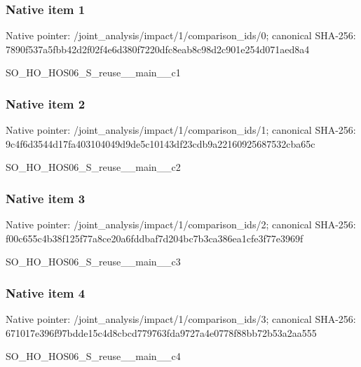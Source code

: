 \documentclass[10pt,a4paper]{article}
\begin{document}
\subsubsection{Native item 1}
Native pointer: /joint\_\allowbreak{}analysis/impact/1/comparison\_\allowbreak{}ids/0; canonical SHA-256: 7890f537a5fbb42d2f02f4e6d380f7220dfc8eab8c98d2c901e254d071aed8a4

\begingroup\raggedright\sloppy SO\_\allowbreak{}HO\_\allowbreak{}HOS06\_\allowbreak{}S\_\allowbreak{}reuse\_\allowbreak{}\_\allowbreak{}main\_\allowbreak{}\_\allowbreak{}c1\par\endgroup

\subsubsection{Native item 2}
Native pointer: /joint\_\allowbreak{}analysis/impact/1/comparison\_\allowbreak{}ids/1; canonical SHA-256: 9c4f6d3544d17fa403104049d9de5c10143df23cdb9a22160925687532cba65c

\begingroup\raggedright\sloppy SO\_\allowbreak{}HO\_\allowbreak{}HOS06\_\allowbreak{}S\_\allowbreak{}reuse\_\allowbreak{}\_\allowbreak{}main\_\allowbreak{}\_\allowbreak{}c2\par\endgroup

\subsubsection{Native item 3}
Native pointer: /joint\_\allowbreak{}analysis/impact/1/comparison\_\allowbreak{}ids/2; canonical SHA-256: f00c655c4b38f125f77a8ce20a6fddbaf7d204bc7b3ca386ea1cfe3f77e3969f

\begingroup\raggedright\sloppy SO\_\allowbreak{}HO\_\allowbreak{}HOS06\_\allowbreak{}S\_\allowbreak{}reuse\_\allowbreak{}\_\allowbreak{}main\_\allowbreak{}\_\allowbreak{}c3\par\endgroup

\subsubsection{Native item 4}
Native pointer: /joint\_\allowbreak{}analysis/impact/1/comparison\_\allowbreak{}ids/3; canonical SHA-256: 671017e396f97bdde15c4d8cbcd779763fda9727a4e0778f88bb72b53a2aa555

\begingroup\raggedright\sloppy SO\_\allowbreak{}HO\_\allowbreak{}HOS06\_\allowbreak{}S\_\allowbreak{}reuse\_\allowbreak{}\_\allowbreak{}main\_\allowbreak{}\_\allowbreak{}c4\par\endgroup
\end{document}
